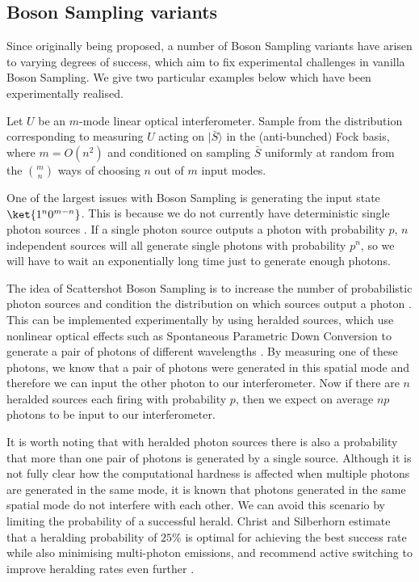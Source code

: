 \subsection{Boson Sampling variants}
\label{ssec:bs-variants}

Since originally being proposed, a number of Boson Sampling variants have arisen to varying degrees of success, which aim to fix experimental challenges in vanilla Boson Sampling. We give two particular examples below which have been experimentally realised.

\begin{problem} Let $U$ be an $m$-mode linear optical interferometer. Sample from the distribution corresponding to measuring $U$ acting on $|\bar{S}\rangle$ in the (anti-bunched) Fock basis, where $m=O(n^2)$ and conditioned on sampling $\bar{S}$ uniformly at random from the $\binom{m}{n}$ ways of choosing $n$ out of $m$ input modes.
\end{problem}

One of the largest issues with Boson Sampling is generating the input state $\ket{1^n0^{m-n}}$. This is because we do not currently have deterministic single photon sources \cite{eisaman2011}. If a single photon source outputs a photon with probability $p$, $n$ independent sources will all generate single photons with probability $p^n$, so we will have to wait an exponentially long time just to generate enough photons.

The idea of Scattershot Boson Sampling is to increase the number of probabilistic photon sources and condition the distribution on which sources output a photon \cite{aaronson2013, lund2014}. This can be implemented experimentally by using heralded sources, which use nonlinear optical effects such as Spontaneous Parametric Down Conversion to generate a pair of photons of different wavelengths \cite{loudon2006}. By measuring one of these photons, we know that a pair of photons were generated in this spatial mode and therefore we can input the other photon to our interferometer. Now if there are $n$ heralded sources each firing with probability $p$, then we expect on average $np$ photons to be input to our interferometer.

It is worth noting that with heralded photon sources there is also a probability that more than one pair of photons is generated by a single source. Although it is not fully clear how the computational hardness is affected when multiple photons are generated in the same mode, it is known that photons generated in the same spatial mode do not interfere with each other. We can avoid this scenario by limiting the probability of a successful herald. Christ and Silberhorn estimate that a heralding probability of $25\%$ is optimal for achieving the best success rate while also minimising multi-photon emissions, and recommend active switching to improve heralding rates even further \cite{christ2012}.

